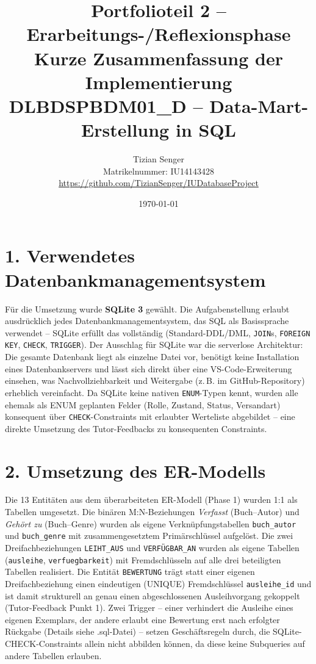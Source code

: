 \documentclass[11pt,a4paper]{article}
\title{\vspace{-1.5cm}\Large\textbf{Portfolioteil 2 -- Erarbeitungs-/Reflexionsphase}\\[2pt]
\large Kurze Zusammenfassung der Implementierung\\[2pt]
\normalsize DLBDSPBDM01\_D -- Data-Mart-Erstellung in SQL}
\author{Tizian Senger \\ Matrikelnummer: IU14143428 \\ \url{https://github.com/TizianSenger/IUDatabaseProject}}
\date{\today}
\begin{document}
\maketitle
\vspace{-1cm}

\section*{1. Verwendetes Datenbankmanagementsystem}
Für die Umsetzung wurde \textbf{SQLite 3} gewählt. Die Aufgabenstellung erlaubt ausdrücklich jedes Datenbankmanagementsystem, das SQL als Basissprache verwendet -- SQLite erfüllt das vollständig (Standard-DDL/DML, \texttt{JOIN}s, \texttt{FOREIGN KEY}, \texttt{CHECK}, \texttt{TRIGGER}). Der Ausschlag für SQLite war die serverlose Architektur: Die gesamte Datenbank liegt als einzelne Datei vor, benötigt keine Installation eines Datenbankservers und lässt sich direkt über eine VS-Code-Erweiterung einsehen, was Nachvollziehbarkeit und Weitergabe (z.\,B. im GitHub-Repository) erheblich vereinfacht. Da SQLite keine nativen \texttt{ENUM}-Typen kennt, wurden alle ehemals als ENUM geplanten Felder (Rolle, Zustand, Status, Versandart) konsequent über \texttt{CHECK}-Constraints mit erlaubter Werteliste abgebildet -- eine direkte Umsetzung des Tutor-Feedbacks zu konsequenten Constraints.

\section*{2. Umsetzung des ER-Modells}
Die 13 Entitäten aus dem überarbeiteten ER-Modell (Phase 1) wurden 1:1 als Tabellen umgesetzt. Die binären M:N-Beziehungen \emph{Verfasst} (Buch--Autor) und \emph{Gehört zu} (Buch--Genre) wurden als eigene Verknüpfungstabellen \texttt{buch\_autor} und \texttt{buch\_genre} mit zusammengesetztem Primärschlüssel aufgelöst. Die zwei Dreifachbeziehungen \texttt{LEIHT\_AUS} und \texttt{VERFÜGBAR\_AN} wurden als eigene Tabellen (\texttt{ausleihe}, \texttt{verfuegbarkeit}) mit Fremdschlüsseln auf alle drei beteiligten Tabellen realisiert. Die Entität \texttt{BEWERTUNG} trägt statt einer eigenen Dreifachbeziehung einen eindeutigen (UNIQUE) Fremdschlüssel \texttt{ausleihe\_id} und ist damit strukturell an genau einen abgeschlossenen Ausleihvorgang gekoppelt (Tutor-Feedback Punkt 1). Zwei Trigger -- einer verhindert die Ausleihe eines eigenen Exemplars, der andere erlaubt eine Bewertung erst nach erfolgter Rückgabe (Details siehe .sql-Datei) -- setzen Geschäftsregeln durch, die SQLite-CHECK-Constraints allein nicht abbilden können, da diese keine Subqueries auf andere Tabellen erlauben.
\end{document}
